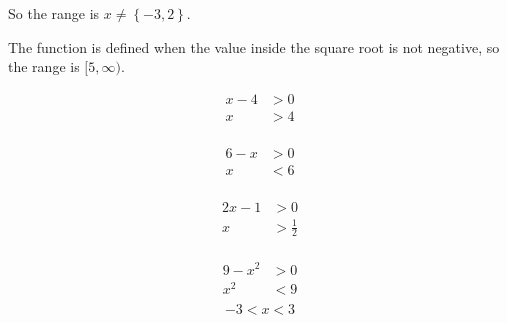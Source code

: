 \documentclass{exam}
\begin{document}
\begin{description}
      So the range is $x \neq \left\{ -3, 2 \right\}$.

    \item[45]
      The function is defined when the value inside the square root is not negative, so the range is $[5, \infty)$.

    \item[55]
      \begin{align*}
        x - 4 &> 0 \\
        x     &> 4 \\
      \end{align*}

    \item[56]
      \begin{align*}
        6 - x &> 0 \\
        x     &< 6 \\
      \end{align*}

    \item[57]
      \begin{align*}
        2x - 1 &> 0 \\
        x      &> \frac{1}{2} \\
      \end{align*}

    \item[58]
      \begin{align*}
        9 - x^2 &> 0 \\
        x^2     &< 9 \\
      \end{align*}
      \[
        -3 < x < 3
      \]

    \item[59]


\end{description}
\end{document}
